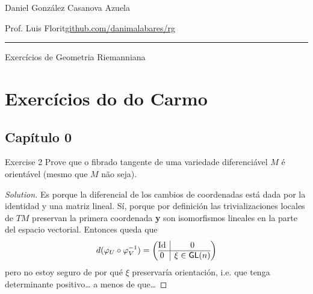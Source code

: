 \usepackage{mdframed}

\newcommand{\rightlooparrow}{\mathbin{
    \vbox{\openup-10.25pt\halign{\hss$##$\hss\cr\circ\cr\longrightarrow\cr}}
}}



\begin{minipage}{\textwidth}
	\begin{minipage}{1\textwidth}
		\hfill Daniel González Casanova Azuela
		
		{\small Prof. Luis Florit\hfill\href{https://github.com/danimalabares/rg}{github.com/danimalabares/rg}}
	\end{minipage}
\end{minipage}\vspace{.2cm}\hrule

\vspace{10pt}
{\huge Exercícios de Geometria Riemanniana}
\tableofcontents

\section{Exercícios do do Carmo}

\subsection{Capítulo 0}
\begin{thing4}{Exercise 2}\label{exer:2}\leavevmode
Prove que o fibrado tangente de uma variedade diferenciável \(M\) é orientável (mesmo que \(M\) não seja).
\end{thing4}

\begin{proof}[Solution]\leavevmode
Es porque la diferencial de los cambios de coordenadas está dada por la identidad y una matriz lineal. Sí, porque por definición las trivializaciones locales de \(TM\) preservan la primera coordenada \textbf{y} son isomorfismos lineales en la parte del espacio vectorial. Entonces queda que 
\[d(\varphi_U \circ \varphi_V^{-1})=\left(\begin{array}{@{}c|c@{}}
\operatorname{Id}&0\\
\hline
0&\xi \in \mathsf{GL}(n)\end{array}\right)\]
pero no estoy seguro de por qué \(\xi\) preservaría orientación, i.e. que tenga determinante positivo… a menos de que… 
\end{proof}

